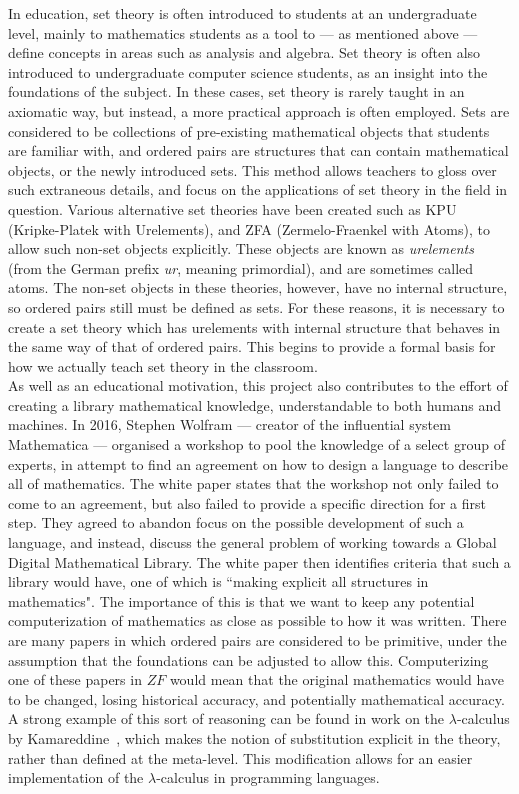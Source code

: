 \documentclass[11pt]{report}
\theoremstyle{definition}
\theoremstyle{theorem}
\theoremstyle{lemma}
\begin{document}
In education, set theory is often introduced to students at an undergraduate level, mainly to mathematics students as a tool to --- as mentioned above --- define concepts in areas such as analysis and algebra.
Set theory is often also introduced to undergraduate computer science students, as an insight into the foundations of the subject.
In these cases, set theory is rarely taught in an axiomatic way, but instead, a more practical approach is often employed. 
Sets are considered to be collections of pre-existing mathematical objects that students are familiar with, and ordered pairs are structures that can contain mathematical objects, or the newly introduced sets.  
This method allows teachers to gloss over such extraneous details, and focus on the applications of set theory in the field in question.
Various alternative set theories have been created such as KPU (Kripke-Platek with Urelements), and ZFA (Zermelo-Fraenkel with Atoms), to allow such non-set objects explicitly.
These objects are known as \emph{urelements} (from the German prefix \emph{ur}, meaning primordial), and are sometimes called atoms.
The non-set objects in these theories, however, have no internal structure, so ordered pairs still must be defined as sets.
For these reasons, it is necessary to create a set theory which has urelements with internal structure that behaves in the same way of that of ordered pairs. 
This begins to provide a formal basis for how we actually teach set theory in the classroom. \\

As well as an educational motivation, this project also contributes to the effort of creating a library mathematical knowledge, understandable to both humans and machines.
In 2016, Stephen Wolfram --- creator of the influential system Mathematica --- organised a workshop to pool the knowledge of a select group of experts, in attempt to find an agreement on how to design a language to describe all of mathematics. 
The white paper states that the workshop not only failed to come to an agreement, but also failed to provide a specific direction for a first step. 
They agreed to abandon focus on the possible development of such a language, and instead, discuss the general problem of working towards a Global Digital Mathematical Library. 
The white paper then identifies criteria that such a library would have, one of which is ``making explicit all structures in mathematics". 
The importance of this is that we want to keep any potential computerization of mathematics as close as possible to how it was written. 
There are many papers in which ordered pairs are considered to be primitive, under the assumption that the foundations can be adjusted to allow this. 
Computerizing one of these papers in $\mathit{ZF}$ would mean that the original mathematics would have to be changed, losing historical accuracy, and potentially mathematical accuracy. 
A strong example of this sort of reasoning can be found in work on the $\lambda$-calculus by Kamareddine~\cite{fairouz}, which makes the notion of substitution explicit in the theory, rather than defined at the meta-level.
This modification allows for an easier implementation of the $\lambda$-calculus in programming languages. 
\end{document}
